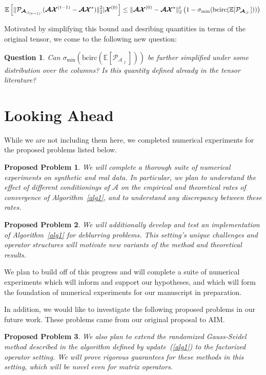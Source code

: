 \documentclass[10.5pt]{amsart}
\newtheorem{PropProb}{Proposed Problem}
\newcommand{\E}{\mathbb{E}}
\newtheorem{question}{Question}
\newcommand{\tens}[1]{\bm{\mathcal{#1}}}
\def\tA{{\tens{A}}}  %
\def\tX{{\tens{X}}}  %
\def\E{{\mathbb{E}}} %
\def\bcirc{{\text{bcirc}}}
\begin{document}
$$ \E\left[\|\mathcal{P}_{\tA_{:j_{(t-1)}:}}(\tA \tX^{(t-1)} -\tA \tX^{\star})\|_2^2 \vert \tX^{(0)} \right] \leq \| \tA \tX^{(0)} - \tA \tX^{\star}\|_2^t\left (1 - \sigma_{\min}( \bcirc(\E[\mathcal{P}_{\tA_{:j:}}]))\right)\\$$

Motivated by simplifying this bound and desribing quantities in terms of the original tensor, we come to the following new question:

\begin{question}
    Can $\sigma_{\min}( \bcirc(\E[\mathcal{P}_{\tA_{:j:}}]))$ be further simplified under some distribution over the columns?  Is this quantity defined already in the tensor literature? \label{ques:sigma min}
\end{question}

\section{Looking Ahead}

While we are not including them here, we completed numerical experiments for the proposed problems listed below.
\begin{PropProb}
We will complete a thorough suite of numerical experiments on synthetic and real data.  In particular, we plan to understand the effect of different conditionings of $\tA$ on the empirical and theoretical rates of convergence of Algorithm~\ref{alg1}, and to understand any discrepancy between these rates.
\end{PropProb}

\begin{PropProb}
We will additionally develop and test an implementation of Algorithm~\ref{alg1} for deblurring problems.  This setting's unique challenges and operator structures will motivate new variants of the method and theoretical results.   
\end{PropProb}

We plan to build off of this progress and will complete a suite of numerical experiments which will inform and support our hypotheses, and which will form the foundation of numerical experiments for our manuscript in preparation.

In addition, we would like to investigate the following proposed problems in our future work.  These problems came from our original proposal to AIM.

\begin{PropProb}
    We also plan to extend the randomized Gauss-Seidel method described in the algorithm defined by update~(\ref{alg1}) to the factorized operator setting. We will prove rigorous guarantees for these methods in this setting, which will be novel even for matrix operators.
\end{PropProb}
\end{document}
